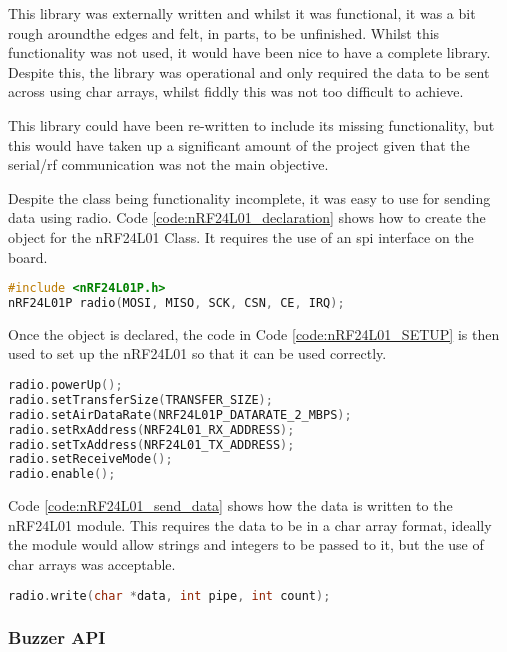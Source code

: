 \documentclass [11pt]{article}
\begin{document}
This library was externally written and whilst it was functional, it was a bit rough aroundthe edges and felt, in parts, to be unfinished. Whilst this functionality was not used, it would have been nice to have a complete library. Despite this, the library was operational and only required the data to be sent across using char arrays, whilst fiddly this was not too difficult to achieve. 

This library could have been re-written to include its missing functionality, but this would have taken up a significant amount of the project given that the serial/\gls{rf} communication was not the main objective.     

Despite the class being functionality incomplete, it was easy to use for sending data using radio. Code \ref{code:nRF24L01_declaration} shows how to create the object for the nRF24L01 Class. It requires the use of an \gls{spi} interface on the board.  

\begin{lstlisting}[language=C++,label=code:nRF24L01_declaration,caption=nRF24L01 Class Constructor]
#include <nRF24L01P.h>
nRF24L01P radio(MOSI, MISO, SCK, CSN, CE, IRQ);
\end{lstlisting}

Once the object is declared, the code in Code \ref{code:nRF24L01_SETUP} is then used to set up the nRF24L01 so that it can be used correctly. 

\begin{lstlisting}[language=C++,label=code:nRF24L01_SETUP,caption=nRF24L01 Set Up]
radio.powerUp();
radio.setTransferSize(TRANSFER_SIZE);
radio.setAirDataRate(NRF24L01P_DATARATE_2_MBPS);
radio.setRxAddress(NRF24L01_RX_ADDRESS);
radio.setTxAddress(NRF24L01_TX_ADDRESS);
radio.setReceiveMode();
radio.enable();
\end{lstlisting}

Code \ref{code:nRF24L01_send_data} shows how the data is written to the nRF24L01 module. This requires the data to be in a char array format, ideally the module would allow strings and integers to be passed to it, but the use of char arrays was acceptable.

\begin{lstlisting}[language=C++,label=code:nRF24L01_send_data,caption=Sending Data Using nRF24L01]
radio.write(char *data, int pipe, int count);
\end{lstlisting}



\subsubsection{Buzzer API}
\end{document}
